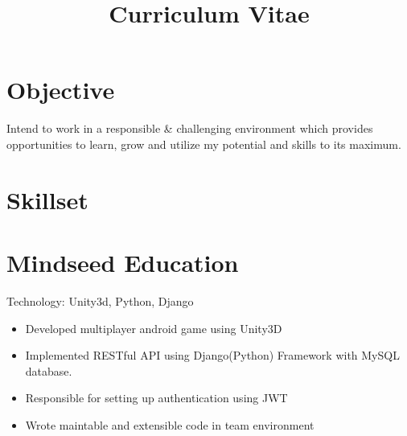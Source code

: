 \documentclass[11pt,a4paper,sans]{moderncv} %
\title{Curriculum Vitae}
\begin{document}
\makecvtitle %

\vspace{-10mm}


\section{Objective}

Intend to work in a responsible \& challenging environment which provides opportunities to learn, grow and utilize my potential and skills to its maximum.

\section{Skillset}




\section{Mindseed Education}

{Technology: Unity3d, Python, Django}{}{}
{\begin{itemize}
\item Developed multiplayer android game using Unity3D
\item Implemented RESTful API using Django(Python) Framework with MySQL database.
\item Responsible for setting up authentication using JWT
\item Wrote maintable and extensible code in team environment
\end{itemize}}
\end{document}
